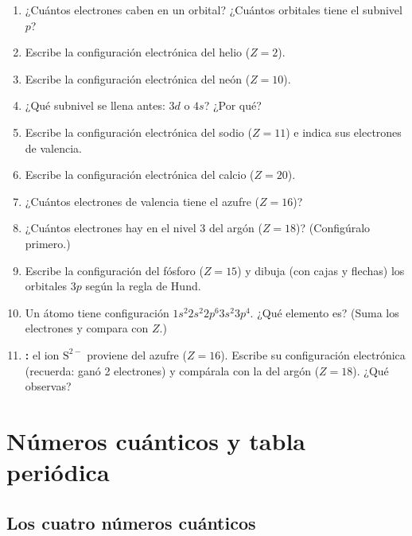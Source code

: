 \documentclass[12pt, letterpaper]{article}
\begin{document}
\begin{enumerate}[leftmargin=*, resume]
  \item \facil{} ¿Cuántos electrones caben en un orbital? ¿Cuántos orbitales tiene el subnivel $p$?

  \item \facil{} Escribe la configuración electrónica del helio ($Z = 2$).

  \item \facil{} Escribe la configuración electrónica del neón ($Z = 10$).

  \item \facil{} ¿Qué subnivel se llena antes: $3d$ o $4s$? ¿Por qué?

  \item \medio{} Escribe la configuración electrónica del sodio ($Z = 11$) e indica sus electrones de valencia.

  \item \medio{} Escribe la configuración electrónica del calcio ($Z = 20$).

  \item \medio{} ¿Cuántos electrones de valencia tiene el azufre ($Z = 16$)?

  \item \medio{} ¿Cuántos electrones hay en el nivel 3 del argón ($Z = 18$)? (Configúralo primero.)

  \item \dificil{} Escribe la configuración del fósforo ($Z = 15$) y dibuja (con cajas y flechas) los orbitales $3p$ según la regla de Hund.

  \item \dificil{} Un átomo tiene configuración $1s^{2}2s^{2}2p^{6}3s^{2}3p^{4}$. ¿Qué elemento es? (Suma los electrones y compara con $Z$.)

  \item \dificil{} \textbf{:} el ion $\text{S}^{2-}$ proviene del azufre ($Z = 16$). Escribe su configuración electrónica (recuerda: ganó 2 electrones) y compárala con la del argón ($Z = 18$). ¿Qué observas?
\end{enumerate}

\section{Números cuánticos y tabla periódica}

\subsection{Los cuatro números cuánticos}
\end{document}
